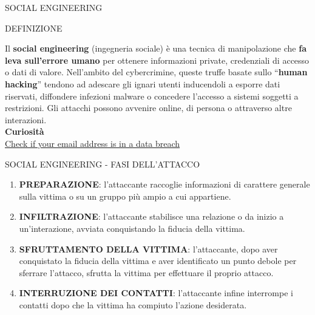 \documentclass[aspectratio=1610]{beamer}
\begin{document}
\begin{frame}{SOCIAL ENGINEERING}
    \begin{alertblock}{DEFINIZIONE}
        \begin{minipage}{0.98\linewidth}
            \justifying
            Il \textbf{social engineering} (ingegneria sociale) è una tecnica di manipolazione che \textbf{fa leva sull'errore umano} 
            per ottenere informazioni private, credenziali di accesso o dati di valore. Nell'ambito del 
            cybercrimine, queste truffe basate sullo ``\textbf{human hacking}'' tendono ad adescare gli ignari 
            utenti inducendoli a esporre dati riservati, diffondere infezioni malware o concedere l'accesso 
            a sistemi soggetti a restrizioni. Gli attacchi possono avvenire online, di persona o attraverso 
            altre interazioni.\\
            \bigskip
            \tiny{\textbf{Curiosità}}\\
            \tiny{\href{https://haveibeenpwned.com/}{Check if your email address is in a data breach}}
        \end{minipage}
    \end{alertblock}
\end{frame}

\begin{frame}{SOCIAL ENGINEERING - FASI DELL'ATTACCO}
    \begin{enumerate}
        \item \textbf{PREPARAZIONE}: l'attaccante raccoglie informazioni di carattere generale sulla vittima 
        o su un gruppo più ampio a cui appartiene.
        \pause
        \item \textbf{INFILTRAZIONE}: l'attaccante stabilisce una relazione o da inizio a un'interazione, 
        avviata conquistando la fiducia della vittima.
        \pause
        \item \textbf{SFRUTTAMENTO DELLA VITTIMA}: l'attaccante, dopo aver conquistato la fiducia della vittima 
        e aver identificato un punto debole per sferrare l'attacco, sfrutta la vittima per effettuare il proprio attacco.
        \pause
        \item \textbf{INTERRUZIONE DEI CONTATTI}: l'attaccante infine interrompe i contatti dopo che la vittima ha compiuto l'azione desiderata.
    \end{enumerate}
\end{frame}
\end{document}
